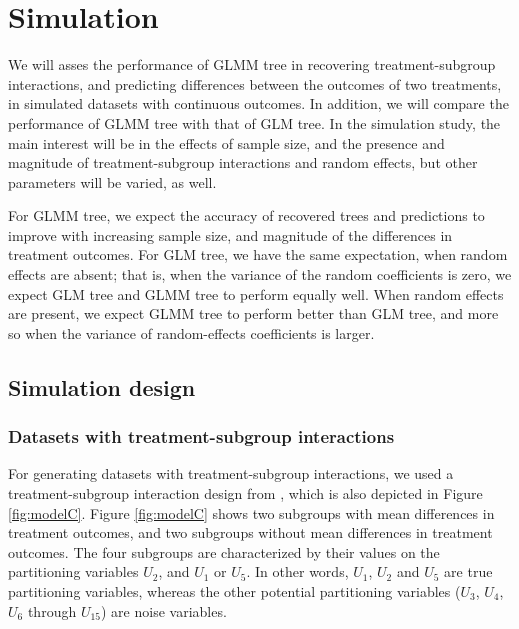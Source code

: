 \documentclass[nobf,doc]{apa}
\begin{document}
\section{Simulation}

We will asses the performance of GLMM tree in recovering treatment-subgroup interactions, and predicting differences between the outcomes of two treatments, in simulated datasets with continuous outcomes. In addition, we will compare the performance of GLMM tree with that of GLM tree. In the simulation study, the main interest will be in the effects of sample size, and the presence and magnitude of treatment-subgroup interactions and random effects, but other parameters will be varied, as well. 

For GLMM tree, we expect the accuracy of recovered trees and predictions to improve with increasing sample size, and magnitude of the differences in treatment outcomes. For GLM tree, we have the same expectation, when random effects are absent; that is, when the variance of the random coefficients is zero, we expect GLM tree and GLMM tree to perform equally well. When random effects are present, we expect GLMM tree to perform better than GLM tree, and more so when the variance of random-effects coefficients is larger.



\subsection{Simulation design}

\subsubsection{Datasets with treatment-subgroup interactions}
For generating datasets with treatment-subgroup interactions, we used a treatment-subgroup interaction design from , which is also depicted in Figure \ref{fig:modelC}. Figure \ref{fig:modelC} shows two subgroups with mean differences in treatment outcomes, and two subgroups without mean differences in treatment outcomes. The four subgroups are characterized by their values on the partitioning variables $U_2$, and $U_1$ or $U_5$. In other words, $U_1$, $U_2$ and $U_5$ are true partitioning variables, whereas the other potential partitioning variables ($U_3$, $U_4$, $U_6$ through $U_{15}$) are noise variables.
\end{document}
